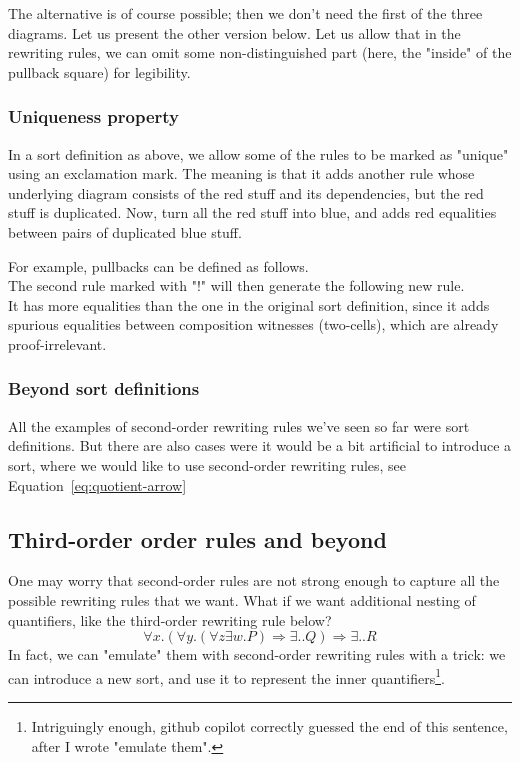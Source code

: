 \documentclass{article}
\begin{document}
The alternative is of course possible; then we don't need the first of the three diagrams. Let us present the other version below.
Let us allow that in the rewriting rules, we can omit some non-distinguished part (here, the "inside" of the pullback square) for legibility.
\[

\]

\subsubsection{Uniqueness property}
In a sort definition as above, we allow some of the rules to be marked as "unique" using an exclamation mark.
The meaning is that it adds another rule whose underlying diagram consists of the red stuff and its dependencies, but the red stuff is duplicated.
Now, turn all the red stuff into blue, and adds red equalities between pairs of duplicated blue stuff.

For example, pullbacks can be defined as follows.
\[

\]
The second rule marked with "!" will then generate the following new rule.
\[

\]
It has more equalities than the one in the original sort definition,
since it adds spurious equalities between composition witnesses (two-cells), which 
are already proof-irrelevant.

\subsubsection{Beyond sort definitions}
All the examples of second-order rewriting rules we've seen so far
were sort definitions.
But there are also cases were it would be a bit artificial to introduce a sort, where we would like to use second-order rewriting rules, see Equation~\eqref{eq:quotient-arrow}


    \subsection{Third-order order rules and beyond}
One may worry that second-order rules are not strong enough to capture all the possible rewriting rules that we want. What if we want additional nesting of quantifiers, like the third-order rewriting rule below?
\begin{equation}
    \label{eq:third-order}
∀ x. \left(∀y. (∀z ∃ w.P) ⇒ ∃..Q  \right) 
⇒ ∃.. R 
\end{equation}
In fact, we can "emulate" them with second-order rewriting rules with a trick: we can introduce a new sort, and use it to represent the inner quantifiers\footnote{Intriguingly enough, github copilot correctly guessed the end of this sentence, after I wrote "emulate them".}. 
\end{document}
